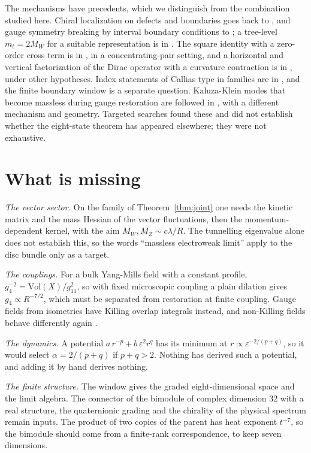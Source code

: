 \documentclass[aps,prd,reprint,onecolumn,nofootinbib,amsmath,amssymb,floatfix]{revtex4-2}
\theoremstyle{plain}
\begin{document}
The mechanisms have precedents, which we distinguish from the combination studied here. Chiral localization on defects and boundaries goes back to \cite{Kaplan1992,Shamir1993}, and gauge symmetry breaking by interval boundary conditions to \cite{Csaki2004,Csaki2003}; a tree-level $m_t=2M_W$ for a suitable representation is in \cite{CCP2006}. The square identity with a zero-order cross term is in \cite{Maridakis2015}, in a concentrating-pair setting, and a horizontal and vertical factorization of the Dirac operator with a curvature contraction is in \cite{KvS2017}, under other hypotheses. Index statements of Callias type in families are in \cite{Callias1978,Kottke2009}, and the finite boundary window is a separate question. Kaluza-Klein modes that become massless during gauge restoration are followed in \cite{Iso2021}, with a different mechanism and geometry. Targeted searches found these and did not establish whether the eight-state theorem has appeared elsewhere; they were not exhaustive.

\section{What is missing}

\emph{The vector sector.} On the family of Theorem~\ref{thm:joint} one needs the kinetic matrix and the mass Hessian of the vector fluctuations, then the momentum-dependent kernel, with the aim $M_W,M_Z\sim c\lambda/R$. The tunnelling eigenvalue alone does not establish this, so the words ``massless electroweak limit'' apply to the disc bundle only as a target.

\emph{The couplings.} For a bulk Yang-Mills field with a constant profile, $g_4^{-2}=\mathrm{Vol}(X)/g_{11}^2$, so with fixed microscopic coupling a plain dilation gives $g_4\propto R^{-7/2}$, which must be separated from restoration at finite coupling. Gauge fields from isometries have Killing overlap integrals instead, and non-Killing fields behave differently again \cite{Baptista2026}.

\emph{The dynamics.} A potential $a\,r^{-p}+b\,\varepsilon^2r^q$ has its minimum at $r\propto\varepsilon^{-2/(p+q)}$, so it would select $\alpha=2/(p+q)$ if $p+q>2$. Nothing has derived such a potential, and adding it by hand derives nothing.

\emph{The finite structure.} The window gives the graded eight-dimensional space and the limit algebra. The connector of the bimodule of complex dimension 32 with a real structure, the quaternionic grading and the chirality of the physical spectrum remain inputs. The product of two copies of the parent has heat exponent $t^{-7}$, so the bimodule should come from a finite-rank correspondence, to keep seven dimensions.
\end{document}
